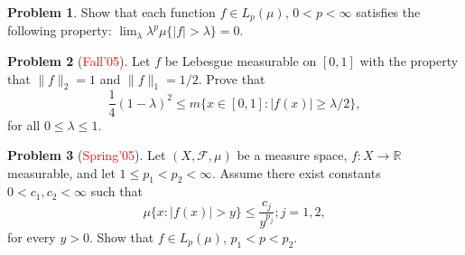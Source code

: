 \documentclass[12pt,reqno]{amsart}
\def\field#1{\mathbb{#1}}
\def\abs#1{\lvert {#1} \rvert}
\def\Lpnorm#1#2{\lVert {#1} \rVert_{#2}}
\theoremstyle{definition}
\newtheorem{problem}{Problem}
\theoremstyle{remark}
\begin{document}
\begin{problem}
  Show that each function $f \in L_p(\mu)$, $0<p<\infty$ satisfies the
  following property: $\lim_\lambda \lambda^p \mu\{ \abs{f} > \lambda
  \} = 0$.
\end{problem}
\begin{problem}[\textcolor{red}{Fall'05}]
  Let $f$ be Lebesgue measurable on $[0,1]$ with the property that
  $\Lpnorm{f}{2} =1$ and $\Lpnorm{f}{1} =1/2$. Prove that
  \begin{equation*}
    \frac{1}{4} (1-\lambda)^2 \leq m \big\{ x \in [0,1] : \abs{f(x)}
    \geq \lambda/2 \big\},
  \end{equation*}
  for all $0 \leq \lambda \leq 1$.
\end{problem}
\begin{problem}[\textcolor{red}{Spring'05}]
  Let $(X, \mathcal{F}, \mu)$ be a measure space, $f\colon X \to
  \field{R}$ measurable, and let $1\leq p_1 < p_2 < \infty$. Assume
  there exist constants $0 < c_1,c_2 < \infty$ such that
  \begin{equation*}
    \mu\{ x : \abs{f(x)} > y \} \leq \frac{c_j}{y^{p_j}}; j=1,2,
  \end{equation*}
  for every $y>0$.  Show that $f \in L_p(\mu)$, $p_1 < p < p_2$.
\end{problem}
\end{document}

